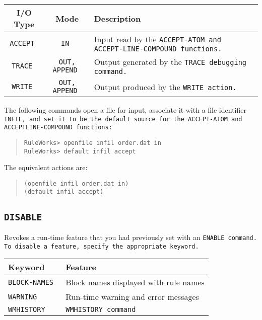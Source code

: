\begin{tabularx}{\columnwidth}{ccX}
  \toprule   
  I/O Type & Mode  &       Description  \\
  \midrule
  \tt{ACCEPT} & \tt{IN}  &  Input read by the \tt{ACCEPT-ATOM}
                           and \tt{ACCEPT-LINE-COMPOUND}
                           functions. \\
  \tt{TRACE} & \tt{OUT}, \tt{APPEND}  & Output generated by the \tt{TRACE} debugging command. \\
  \tt{WRITE} & \tt{OUT}, \tt{APPEND} & Output produced by the \tt{WRITE} action. \\
  \bottomrule
\end{tabularx}

\Example

The following commands open a file for input, associate it with a file
identifier \tt{INFIL}, and set it to be the default source for the
\tt{ACCEPT-ATOM} and \tt{ACCEPTLINE-COMPOUND} functions:

\begin{quote}
\begin{verbatim}
RuleWorks> openfile infil order.dat in
RuleWorks> default infil accept
\end{verbatim}
\end{quote}

The equivalent actions are:

\begin{quote}
\begin{verbatim}
(openfile infil order.dat in)
(default infil accept)
\end{verbatim}
\end{quote}

\subsection{\tt{DISABLE}}

Revokes a run-time feature that you had previously set with an
\tt{ENABLE} command. To disable a feature, specify the appropriate
keyword.

\begin{center}
\begin{tabular}{ll}
  \toprule
  Keyword     & Feature \\
  \midrule
  \tt{BLOCK-NAMES} & Block names displayed with rule names \\
  \tt{WARNING}     & Run-time warning and error messages   \\
  \tt{WMHISTORY}   & \tt{WMHISTORY} command \\
  \bottomrule
\end{tabular}
\end{center}

